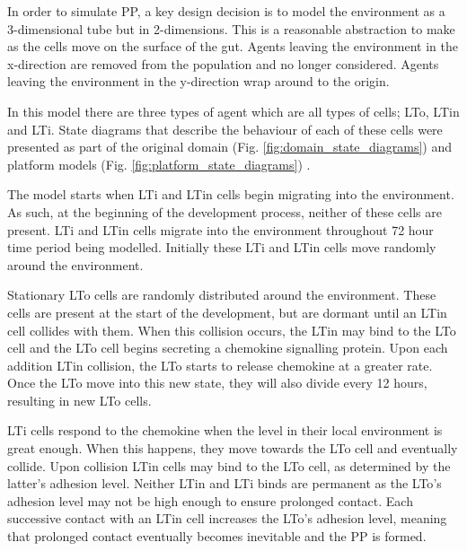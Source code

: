 \documentclass{UoYCSproject}
\begin{document}
In order to simulate \gls{PP}, a key design decision is to model the environment as a 3-dimensional tube but in 2-dimensions.
This is a reasonable abstraction to make as the cells move on the surface of the gut.
Agents leaving the environment in the x-direction are removed from the population and no longer considered.
Agents leaving the environment in the y-direction wrap around to the origin.

In this model there are three types of agent which are all types of cells; \gls{LTo}, \gls{LTin} and \gls{LTi}.
State diagrams that describe the behaviour of each of these cells were presented as part of the original domain (Fig. \ref{fig:domain_state_diagrams}) and platform models (Fig. \ref{fig:platform_state_diagrams}) \cite{kieran_thesis}.

The model starts when \gls{LTi} and \gls{LTin} cells begin migrating into the environment.
As such, at the beginning of the development process, neither of these cells are present.
\gls{LTi} and \gls{LTin} cells migrate into the environment throughout 72 hour time period being modelled.
Initially these \gls{LTi} and \gls{LTin} cells move randomly around the environment.

Stationary \gls{LTo} cells are randomly distributed around the environment.
These cells are present at the start of the development, but are dormant until an \gls{LTin} cell collides with them.
When this collision occurs, the \gls{LTin} may bind to the \gls{LTo} cell and the \gls{LTo} cell begins secreting a chemokine signalling protein.
Upon each addition \gls{LTin} collision, the \gls{LTo} starts to release chemokine at a greater rate.
Once the \gls{LTo} move into this new state, they will also divide every 12 hours, resulting in new \gls{LTo} cells.

\gls{LTi} cells respond to the chemokine when the level in their local environment is great enough.
When this happens, they move towards the \gls{LTo} cell and eventually collide.
Upon collision \gls{LTin} cells may bind to the \gls{LTo} cell, as determined by the latter's adhesion level.
Neither \gls{LTin} and \gls{LTi} binds are permanent as the \gls{LTo}'s adhesion level may not be high enough to ensure prolonged contact.
Each successive contact with an \gls{LTin} cell increases the \gls{LTo}'s adhesion level, meaning that prolonged contact eventually becomes inevitable and the \gls{PP} is formed.
\end{document}
